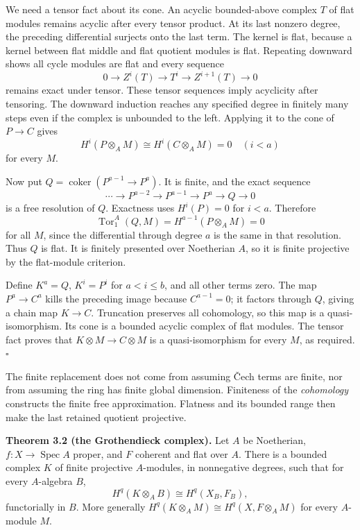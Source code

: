 \documentclass[11pt]{article}
\begin{document}
We need a tensor fact about its cone. An acyclic bounded-above complex
\(T\) of flat modules remains acyclic after every tensor product. At its
last nonzero degree, the preceding differential surjects onto the last
term. The kernel is flat, because a kernel between flat middle and flat
quotient modules is flat. Repeating downward shows all cycle modules are
flat and every sequence \[
0\to Z^i(T)\to T^i\to Z^{i+1}(T)\to0
\] remains exact under tensor. These tensor sequences imply acyclicity
after tensoring. The downward induction reaches any specified degree in
finitely many steps even if the complex is unbounded to the left.
Applying it to the cone of \(P\to C\) gives \[
H^i(P\otimes_A M)\cong H^i(C\otimes_A M)=0\quad(i<a)
\] for every \(M\).

Now put \(Q=\operatorname{coker}(P^{a-1}\to P^a)\). It is finite, and
the exact sequence \[
\cdots\to P^{a-2}\to P^{a-1}\to P^a\to Q\to0
\] is a free resolution of \(Q\). Exactness uses \(H^i(P)=0\) for
\(i<a\). Therefore \[
\operatorname{Tor}_1^A(Q,M)=H^{a-1}(P\otimes_A M)=0
\] for all \(M\), since the differential through degree \(a\) is the
same in that resolution. Thus \(Q\) is flat. It is finitely presented
over Noetherian \(A\), so it is finite projective by the flat-module
criterion.

Define \(K^a=Q\), \(K^i=P^i\) for \(a<i\leq b\), and all other terms
zero. The map \(P^a\to C^a\) kills the preceding image because
\(C^{a-1}=0\); it factors through \(Q\), giving a chain map \(K\to C\).
Truncation preserves all cohomology, so this map is a quasi-isomorphism.
Its cone is a bounded acyclic complex of flat modules. The tensor fact
proves that \(K\otimes M\to C\otimes M\) is a quasi-isomorphism for
every \(M\), as required. \(\square\)

The finite replacement does not come from assuming Čech terms are
finite, nor from assuming the ring has finite global dimension.
Finiteness of the \emph{cohomology} constructs the finite free
approximation. Flatness and its bounded range then make the last
retained quotient projective.

\textbf{Theorem 3.2 (the Grothendieck complex).} Let \(A\) be
Noetherian, \(f:X\to\operatorname{Spec}A\) proper, and \(F\) coherent
and flat over \(A\). There is a bounded complex \(K\) of finite
projective \(A\)-modules, in nonnegative degrees, such that for every
\(A\)-algebra \(B\), \[
H^q(K\otimes_A B)\cong H^q(X_B,F_B),
\] functorially in \(B\). More generally
\(H^q(K\otimes_A M)\cong H^q(X,F\otimes_A M)\) for every \(A\)-module
\(M\).
\end{document}

